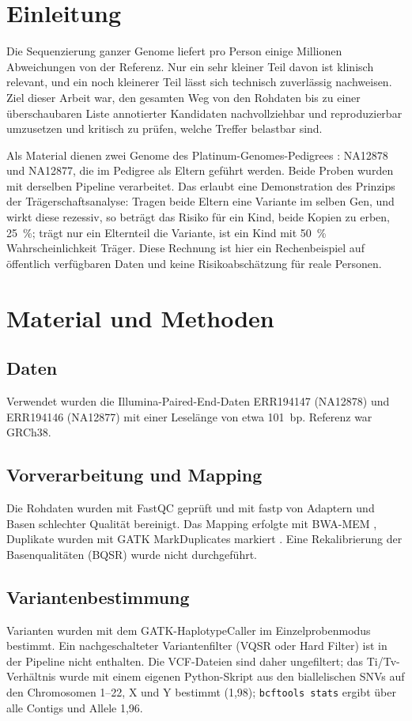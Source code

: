 \documentclass[10pt,a4paper,twocolumn]{article}
\begin{document}
\section{Einleitung}
Die Sequenzierung ganzer Genome liefert pro Person einige Millionen Abweichungen von der Referenz. Nur ein sehr kleiner Teil davon ist klinisch relevant, und ein noch kleinerer Teil l\"asst sich technisch zuverl\"assig nachweisen. Ziel dieser Arbeit war, den gesamten Weg von den Rohdaten bis zu einer \"uberschaubaren Liste annotierter Kandidaten nachvollziehbar und reproduzierbar umzusetzen und kritisch zu pr\"ufen, welche Treffer belastbar sind.

Als Material dienen zwei Genome des Platinum-Genomes-Pedigrees \citep{eberle2017}: NA12878 und NA12877, die im Pedigree als Eltern gef\"uhrt werden. Beide Proben wurden mit derselben Pipeline verarbeitet. Das erlaubt eine Demonstration des Prinzips der Tr\"agerschaftsanalyse: Tragen beide Eltern eine Variante im selben Gen, und wirkt diese rezessiv, so betr\"agt das Risiko f\"ur ein Kind, beide Kopien zu erben, 25~\%; tr\"agt nur ein Elternteil die Variante, ist ein Kind mit 50~\% Wahrscheinlichkeit Tr\"ager. Diese Rechnung ist hier ein Rechenbeispiel auf \"offentlich verf\"ugbaren Daten und keine Risikoabsch\"atzung f\"ur reale Personen.

\section{Material und Methoden}
\subsection{Daten}
Verwendet wurden die Illumina-Paired-End-Daten ERR194147 (NA12878) und ERR194146 (NA12877) mit einer Leselänge von etwa 101~bp. Referenz war GRCh38.

\subsection{Vorverarbeitung und Mapping}
Die Rohdaten wurden mit FastQC \citep{andrews2010} gepr\"uft und mit fastp \citep{chen2018} von Adaptern und Basen schlechter Qualit\"at bereinigt. Das Mapping erfolgte mit BWA-MEM \citep{li2013}, Duplikate wurden mit GATK MarkDuplicates markiert \citep{mckenna2010}. Eine Rekalibrierung der Basenqualit\"aten (BQSR) wurde nicht durchgef\"uhrt.

\subsection{Variantenbestimmung}
Varianten wurden mit dem GATK-HaplotypeCaller \citep{mckenna2010,vanderauwera2013} im Einzelprobenmodus bestimmt. Ein nachgeschalteter Variantenfilter (VQSR oder Hard Filter) ist in der Pipeline nicht enthalten. Die VCF-Dateien sind daher ungefiltert; das Ti/Tv-Verh\"altnis wurde mit einem eigenen Python-Skript aus den biallelischen SNVs auf den Chromosomen 1--22, X und Y bestimmt (1,98); \texttt{bcftools stats} \citep{danecek2021} ergibt \"uber alle Contigs und Allele 1,96.
\end{document}
